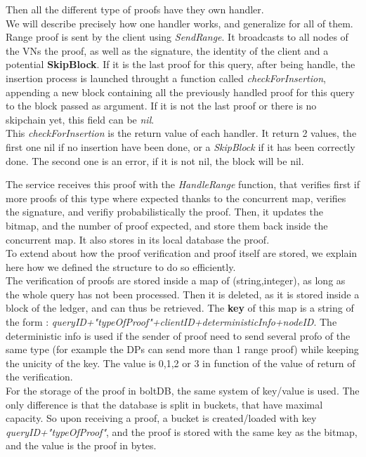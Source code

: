 \documentclass{article}
\begin{document}
Then all the different type of proofs have they own handler.\\
We will describe precisely how one handler works, and generalize for all of them.\\
Range proof is sent by the client using \textit{SendRange}. It broadcasts to all nodes of the VNs the proof, as well as the signature, the identity of the client and a potential \textbf{SkipBlock}. If it is the last proof for this query, after being handle, the insertion process is launched throught a function called \textit{checkForInsertion}, appending a new block containing all the previously handled proof for this query to the block passed as argument. If it is not the last proof or there is no skipchain yet, this field can be \textit{nil}.\\
This \textit{checkForInsertion} is the return value of each handler. It return 2 values, the first one nil if no insertion have been done, or a \textit{SkipBlock} if it has been correctly done. The second one is an error, if it is not nil, the block will be nil.

The service receives this proof with the \textit{HandleRange} function, that verifies first if more proofs of this type where expected thanks to the concurrent map, verifies the signature, and verifiy probabilistically the proof. Then, it updates the bitmap, and the number of proof expected, and store them back inside the concurrent map. It also stores in its local database the proof.\\

To extend about how the proof verification and proof itself are stored, we explain here how we defined the structure to do so efficiently.\\
The verification of proofs are stored inside a map of (string,integer), as long as the whole query has not been processed. Then it is deleted, as it is stored inside a block of the ledger, and can thus be retrieved. The \textbf{key} of this map is a string of the form : \textit{queryID+"typeOfProof"+clientID+deterministicInfo+nodeID}. The deterministic info is used if the sender of proof need to send several profo of the same type (for example the DPs can send more than 1 range proof) while keeping the unicity of the key. The value is 0,1,2 or 3 in function of the value of return of the verification.\\
For the storage of the proof in boltDB, the same system of key/value is used. The only difference is that the database is split in buckets, that  have maximal capacity. So upon receiving a proof, a bucket is created/loaded with key \textit{queryID+"typeOfProof"}, and the proof is stored with the same key as the bitmap, and the value is the proof in bytes.\\
\end{document}
